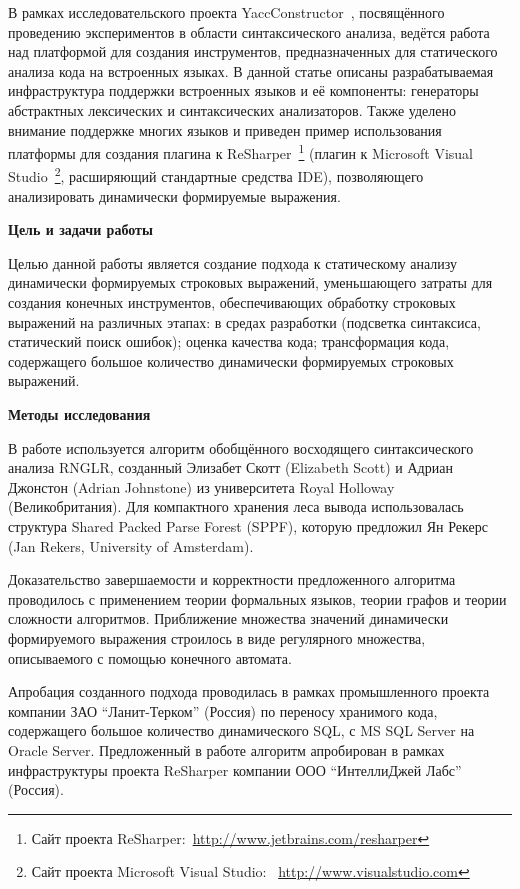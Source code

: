 В рамках исследовательского проекта YaccConstructor~\cite{YCArticle}, посвящённого проведению экспериментов в области синтаксического анализа, ведётся работа над платформой для создания инструментов, предназначенных для статического анализа кода на встроенных языках. В данной статье описаны разрабатываемая инфраструктура поддержки встроенных языков и её компоненты: генераторы абстрактных лексических и синтаксических анализаторов. Также уделено внимание поддержке многих языков и приведен пример использования платформы для создания плагина к ReSharper~\footnote{Сайт проекта ReSharper:~\url{http://www.jetbrains.com/resharper}} (плагин к Microsoft Visual Studio~\footnote{Сайт проекта Microsoft Visual Studio: ~\url{http://www.visualstudio.com}}, расширяющий стандартные средства IDE), позволяющего анализировать динамически формируемые выражения.

\textbf{Цель и задачи работы}

Целью данной работы является создание подхода к статическому анализу динамически формируемых строковых выражений, уменьшающего затраты для создания конечных инструментов, обеспечивающих обработку строковых выражений на различных этапах: в средах разработки (подсветка синтаксиса, статический поиск ошибок); оценка качества кода; трансформация кода, содержащего большое количество динамически формируемых строковых выражений.

\textbf{Методы исследования}

В работе используется алгоритм обобщённого восходящего синтаксического анализа RNGLR, созданный Элизабет Скотт (Elizabeth Scott) и Адриан Джонстон (Adrian Johnstone) из университета Royal Holloway (Великобритания). Для компактного хранения леса вывода использовалась структура Shared Packed Parse Forest (SPPF), которую предложил Ян Рекерс (Jan Rekers, University of Amsterdam).

Доказательство завершаемости и корректности предложенного алгоритма проводилось с применением теории формальных языков, теории графов и теории сложности алгоритмов. Приближение множества значений динамически формируемого выражения строилось в виде регулярного множества, описываемого с помощью конечного автомата.

Апробация созданного подхода проводилась в рамках промышленного проекта компании ЗАО ``Ланит-Терком'' (Россия) по переносу хранимого кода, содержащего большое количество динамического SQL, с MS SQL Server на Oracle Server. Предложенный в работе алгоритм апробирован в рамках инфраструктуры проекта ReSharper компании ООО ``ИнтеллиДжей Лабс'' (Россия).

